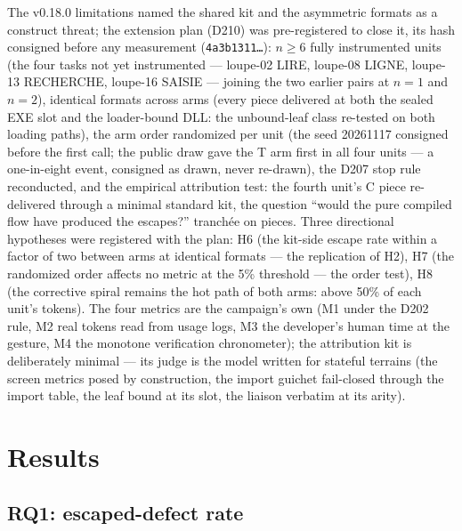 \documentclass[11pt,a4paper]{article}
\newcommand{\code}[1]{\texttt{\small #1}}
\begin{document}
The v0.18.0 limitations named the shared kit and the asymmetric formats
as a construct threat; the extension plan (D210) was pre-registered to
close it, its hash consigned before any measurement
(\code{4a3b1311\ldots}): $n\ge6$ fully instrumented units (the four
tasks not yet instrumented --- loupe-02 LIRE, loupe-08 LIGNE, loupe-13
RECHERCHE, loupe-16 SAISIE --- joining the two earlier pairs at
$n{=}1$ and $n{=}2$), identical formats across arms (every piece
delivered at both the sealed EXE slot and the loader-bound DLL: the
unbound-leaf class re-tested on both loading paths), the arm order
randomized per unit (the seed 20261117 consigned before the first
call; the public draw gave the T arm first in all four units --- a
one-in-eight event, consigned as drawn, never re-drawn), the D207 stop
rule reconducted, and the empirical attribution test: the fourth
unit's C piece re-delivered through a minimal standard kit, the
question ``would the pure compiled flow have produced the escapes?''
tranch\'ee on pieces. Three directional hypotheses were registered
with the plan: H6 (the kit-side escape rate within a factor of two
between arms at identical formats --- the replication of H2), H7 (the
randomized order affects no metric at the 5\% threshold --- the order
test), H8 (the corrective spiral remains the hot path of both arms:
above 50\% of each unit's tokens). The four metrics are the
campaign's own (M1 under the D202 rule, M2 real tokens read from
usage logs, M3 the developer's human time at the gesture, M4 the
monotone verification chronometer); the attribution kit is deliberately
minimal --- its judge is the model written for stateful terrains (the
screen metrics posed by construction, the import guichet fail-closed
through the import table, the leaf bound at its slot, the liaison
verbatim at its arity).

\section{Results}\label{sec:results}

\subsection{RQ1: escaped-defect rate}\label{sec:rq1}
\end{document}
